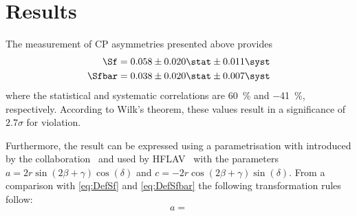 \chapter{Results}

The measurement of CP asymmetries presented above provides
\begin{equation}
\begin{aligned}
\Sf&=0.058\pm0.020\stat\pm0.011\syst\\
\Sfbar&=0.038\pm0.020\stat\pm0.007\syst
\end{aligned}
\end{equation}
where the statistical and systematic correlations are \SI{60}{\percent} and \SI{-41}{\percent}, respectively.
According to Wilk's theorem, these values result in a significance of $2.7\sigma$ for \CP violation.

Furthermore, the result can be expressed using a parametrisation with introduced by the \babar collaboration~\cite{Aubert:2006tw} and used by HFLAV~\cite{HFLAV2016} with the parameters \mbox{$a=2r\sin\!\left(2\beta+\gamma\right)\cos\!\left(\delta\right)$} and \mbox{$c=-2r\cos\!\left(2\beta+\gamma\right)\sin\!\left(\delta\right)$}.
From a comparison with \cref{eq:DefSf} and \eqref{eq:DefSfbar} the following transformation rules follow:
\begin{equation}
a=
\end{equation}


